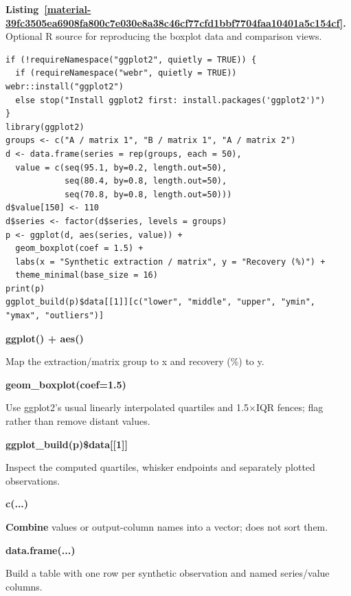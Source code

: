 \documentclass[11pt,a4paper]{article}
\newcounter{listing}
\begin{document}
\medskip

\par\medskip
{}
\label{material-39fc3505ea6908fa800c7e030e8a38c46cf77cfd1bbf7704faa10401a5c154cf}
\noindent\textbf{Listing~\ref*{material-39fc3505ea6908fa800c7e030e8a38c46cf77cfd1bbf7704faa10401a5c154cf}.} Optional R source for reproducing the boxplot data and comparison views.\par\nopagebreak
\begin{Verbatim}[fontsize=\footnotesize,breaklines=true,breakanywhere=true]
if (!requireNamespace("ggplot2", quietly = TRUE)) {
  if (requireNamespace("webr", quietly = TRUE)) webr::install("ggplot2")
  else stop("Install ggplot2 first: install.packages('ggplot2')")
}
library(ggplot2)
groups <- c("A / matrix 1", "B / matrix 1", "A / matrix 2")
d <- data.frame(series = rep(groups, each = 50),
  value = c(seq(95.1, by=0.2, length.out=50),
            seq(80.4, by=0.8, length.out=50),
            seq(70.8, by=0.8, length.out=50)))
d$value[150] <- 110
d$series <- factor(d$series, levels = groups)
p <- ggplot(d, aes(series, value)) +
  geom_boxplot(coef = 1.5) +
  labs(x = "Synthetic extraction / matrix", y = "Recovery (%)") +
  theme_minimal(base_size = 16)
print(p)
ggplot_build(p)$data[[1]][c("lower", "middle", "upper", "ymin", "ymax", "outliers")]
\end{Verbatim}

\par\noindent\textbf{ggplot() + aes()}

Map the extraction/matrix group to x and recovery (\%) to y.

\par\noindent\textbf{geom\_boxplot(coef=1.5)}

Use ggplot2's usual linearly interpolated quartiles and 1.5\ensuremath{\times}IQR fences; flag rather than remove distant values.

\par\noindent\textbf{ggplot\_build(p)\$data[[1]]}

Inspect the computed quartiles, whisker endpoints and separately plotted observations.

\par\noindent\textbf{c(...)}

\textbf{Combine} values or output-column names into a vector; does not sort them.

\par\noindent\textbf{data.frame(...)}

Build a table with one row per synthetic observation and named series/value columns.
\end{document}
